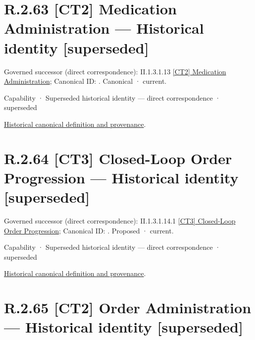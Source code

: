 \section*{R.2.63 [CT2] Medication Administration — Historical identity [superseded]}
\label{navigation:R.2.63}

{\small Governed successor (direct correspondence): II.1.3.1.13 \hyperref[element:c907e2a95629435b9951941ad4e2ebe9]{[CT2] Medication Administration}; Canonical ID: \texttt{}. Canonical · current.}\par
\label{element:5a38bf2527a8404bac714121f2dc76a9}
{\small Capability · Superseded historical identity — direct correspondence · superseded}\par
\href{../../../../continuum/strategy/capability/5a38bf2527a8404bac714121f2dc76a9.md}{Historical canonical definition and provenance}.\par
\section*{R.2.64 [CT3] Closed-Loop Order Progression — Historical identity [superseded]}
\label{navigation:R.2.64}

{\small Governed successor (direct correspondence): II.1.3.1.14.1 \hyperref[element:2f79ebd7392c46ef92def6f25bc9c7ce]{[CT3] Closed-Loop Order Progression}; Canonical ID: \texttt{}. Proposed · current.}\par
\label{element:2ad29cebc1e94053a300d869e7797232}
{\small Capability · Superseded historical identity — direct correspondence · superseded}\par
\href{../../../../continuum/strategy/capability/2ad29cebc1e94053a300d869e7797232.md}{Historical canonical definition and provenance}.\par
\section*{R.2.65 [CT2] Order Administration — Historical identity [superseded]}
\label{navigation:R.2.65}


